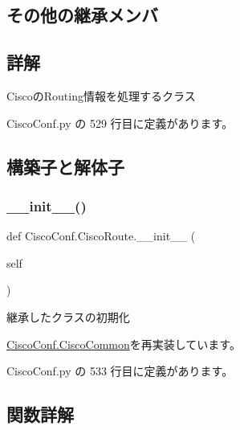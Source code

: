 \subsection*{その他の継承メンバ}


\subsection{詳解}
\begin{DoxyVerb}CiscoのRouting情報を処理するクラス
\end{DoxyVerb}
 

 Cisco\+Conf.\+py の 529 行目に定義があります。



\subsection{構築子と解体子}
\mbox{\label{classCiscoConf_1_1CiscoRoute_a1f0e3788e7f8459ea9de2f8bd21c1b05}} 
\subsubsection{\texorpdfstring{\_\_init\_\_()}{\_\_init\_\_()}}
{\footnotesize\ttfamily def Cisco\+Conf.\+Cisco\+Route.\+\_\+\+\_\+init\+\_\+\+\_\+ (\begin{DoxyParamCaption}\item[{}]{self }\end{DoxyParamCaption})}

\begin{DoxyVerb}継承したクラスの初期化
\end{DoxyVerb}
 

\mbox{\hyperlink{classCiscoConf_1_1CiscoCommon_a67ee86ca701af50e95bed0abfcd09dda}{Cisco\+Conf.\+Cisco\+Common}}を再実装しています。



 Cisco\+Conf.\+py の 533 行目に定義があります。



\subsection{関数詳解}
\mbox{\label{classCiscoConf_1_1CiscoRoute_a0821ef00967e8f689201c1eef239cfdc}} 
